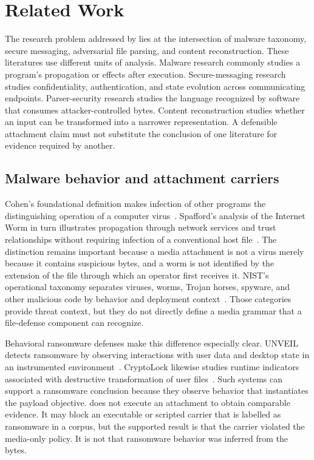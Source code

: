 \section{Related Work}\label{sec:related-work}

The research problem addressed by \AFD{} lies at the intersection of malware
taxonomy, secure messaging, adversarial file parsing, and content
reconstruction. These literatures use different units of analysis. Malware
research commonly studies a program's propagation or effects after execution.
Secure-messaging research studies confidentiality, authentication, and state
evolution across communicating endpoints. Parser-security research studies
the language recognized by software that consumes attacker-controlled bytes.
Content reconstruction studies whether an input can be transformed into a
narrower representation. A defensible attachment claim must not substitute the
conclusion of one literature for evidence required by another.

\subsection{Malware behavior and attachment carriers}

Cohen's foundational definition makes infection of other programs the
distinguishing operation of a computer virus~\cite{cohen1987}. Spafford's
analysis of the Internet Worm in turn illustrates propagation through network
services and trust relationships without requiring infection of a conventional
host file~\cite{spafford1989}. The distinction remains important because a
media attachment is not a virus merely because it contains suspicious bytes,
and a worm is not identified by the extension of the file through which an
operator first receives it. NIST's operational taxonomy separates viruses,
worms, Trojan horses, spyware, and other malicious code by behavior and
deployment context~\cite{nist80083}. Those categories provide threat context,
but they do not directly define a media grammar that a file-defense component
can recognize.

Behavioral ransomware defenses make this difference especially clear. UNVEIL
detects ransomware by observing interactions with user data and desktop state
in an instrumented environment~\cite{kharraz2016}. CryptoLock likewise studies
runtime indicators associated with destructive transformation of user
files~\cite{scaife2016}. Such systems can support a ransomware conclusion
because they observe behavior that instantiates the payload objective. \AFD{}
does not execute an attachment to obtain comparable evidence. It may block an
executable or scripted carrier that is labelled as ransomware in a corpus, but
the supported result is that the carrier violated the media-only policy. It is
not that ransomware behavior was inferred from the bytes.

